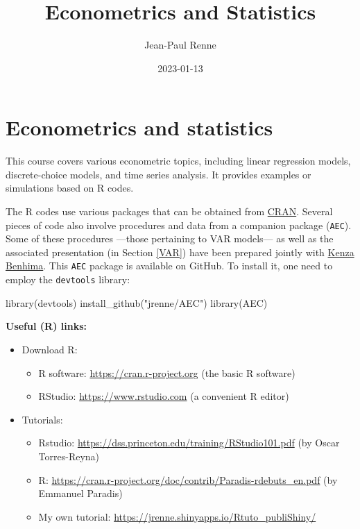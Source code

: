 \documentclass[
  12pt,
]{book}
\title{Econometrics and Statistics}
\author{Jean-Paul Renne}
\date{2023-01-13}
\newenvironment{Shaded}{\begin{snugshade}}{\end{snugshade}}
\newcommand{\FunctionTok}[1]{\textcolor[rgb]{0.00,0.00,0.00}{#1}}
\newcommand{\NormalTok}[1]{#1}
\newcommand{\StringTok}[1]{\textcolor[rgb]{0.31,0.60,0.02}{#1}}
\providecommand{\tightlist}{%
  \setlength{\itemsep}{0pt}\setlength{\parskip}{0pt}}
\theoremstyle{definition}
\theoremstyle{definition}
\theoremstyle{definition}
\theoremstyle{definition}
\theoremstyle{remark}
\begin{document}
\maketitle

{
\setcounter{tocdepth}{1}
\tableofcontents
}
\newcommand{\bv}[1]{\mathbf{#1}}

\hypertarget{intro}{%
\chapter*{Econometrics and statistics}\label{intro}}

This course covers various econometric topics, including linear regression models, discrete-choice models, and time series analysis. It provides examples or simulations based on R codes.

The R codes use various packages that can be obtained from \href{https://cran.r-project.org}{CRAN}. Several pieces of code also involve procedures and data from a companion package (\texttt{AEC}). Some of these procedures ---those pertaining to VAR models--- as well as the associated presentation (in Section \ref{VAR}) have been prepared jointly with \href{https://sites.google.com/site/benhimakenza/}{Kenza Benhima}. This \texttt{AEC} package is available on GitHub. To install it, one need to employ the \texttt{devtools} library:

\begin{Shaded}
\begin{Highlighting}[]
\FunctionTok{library}\NormalTok{(devtools)}
\FunctionTok{install\_github}\NormalTok{(}\StringTok{"jrenne/AEC"}\NormalTok{)}
\FunctionTok{library}\NormalTok{(AEC)}
\end{Highlighting}
\end{Shaded}

\textbf{Useful (R) links:}

\begin{itemize}
\item
  Download R:

  \begin{itemize}
  \tightlist
  \item
    R software: \url{https://cran.r-project.org} (the basic R software)
  \item
    RStudio: \url{https://www.rstudio.com} (a convenient R editor)
  \end{itemize}
\item
  Tutorials:

  \begin{itemize}
  \tightlist
  \item
    Rstudio: \url{https://dss.princeton.edu/training/RStudio101.pdf} (by Oscar Torres-Reyna)
  \item
    R: \url{https://cran.r-project.org/doc/contrib/Paradis-rdebuts_en.pdf} (by Emmanuel Paradis)
  \item
    My own tutorial: \url{https://jrenne.shinyapps.io/Rtuto_publiShiny/}
  \end{itemize}
\end{itemize}
\end{document}

